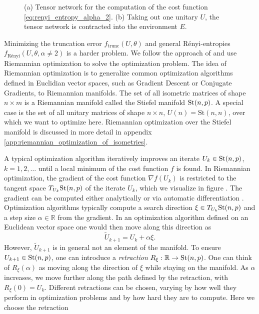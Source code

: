 \begin{figure}
{	}
	\caption{(a) Tensor network for the computation of the cost function \eqref{eq:renyi_entropy_alpha_2}. (b) Taking out one unitary $U$, the tensor network is contracted into the environment $E$.}
	\label{fig:disentangling_evenbly_vidal_algorithm}
\end{figure}
Minimizing the truncation error $f_\text{trunc}\left(U,\theta\right)$ and general Rényi-entropies $f_\text{Rényi}\left(U,\theta,\alpha\neq2\right)$ is a harder problem. We follow the approach of \cite{cite:isometric_tensor_network_states_in_two_dimensions, cite:efficient_simulation_of_dynamics_in_two_dimensional_quantum_spin_systems} and use Riemannian optimization \cite{cite:optimization_on_matrix_manifolds, cite:riemannian_optimization_isometric_tensor_networks, cite:riemannian_geometry_automatic_differentiation_quantum_physics, cite:pymanopt} to solve the optimization problem. The idea of Riemannian optimization is to generalize common optimization algorithms defined in Euclidian vector spaces, such as Gradient Descent or Conjugate Gradients, to Riemannian manifolds. The set of all isometric matrices of shape $n\times m$ is a Riemannian manifold called the Stiefel manifold $\text{St}(n,p)$. A special case is the set of all unitary matrices of shape $n\times n$, $U(n)=\text{St}(n, n)$, over which we want to optimize here. Riemannian optimization over the Stiefel manifold is discussed in more detail in appendix \ref{app:riemannian_optimization_of_isometries}. \par
A typical optimization algorithm iteratively improves an iterate $U_k\in\text{St}(n,p)$, $k=1,2,\dots$ until a local minimum of the cost function $f$ is found. In Riemannian optimization, the gradient of the cost function $\nabla f\left(U_k\right)$ is restricted to the tangent space $T_{U_k}\text{St}(n,p)$ of the iterate $U_k$, which we visualize in figure . The gradient can be computed either analytically or via automatic differentiation \cite{cite:riemannian_geometry_automatic_differentiation_quantum_physics, cite:pymanopt}. Optimization algorithms typically compute a search direction $\xi\in T_{U_k}\text{St}(n,p)$ and a step size $\alpha \in \mathbb{R}$ from the gradient. In an optimization algorithm defined on an Euclidean vector space one would then move along this direction as
\begin{equation}
	\tilde{U}_{k+1} = U_k + \alpha\xi.
\end{equation}
However, $\tilde{U}_{k+1}$ is in general not an element of the manifold. To ensure $U_{k+1}\in\text{St}(n,p)$, one can introduce a \textit{retraction} $R_\xi:\mathbb{R}\to\text{St}(n,p)$. One can think of $R_\xi\left(\alpha\right)$ as moving along the direction of $\xi$ while staying on the manifold. As $\alpha$ increases, we move further along the path defined by the retraction, with $R_\xi(0) = U_k$. Different retractions can be chosen, varying by how well they perform in optimization problems and by how hard they are to compute. Here we choose the retraction
